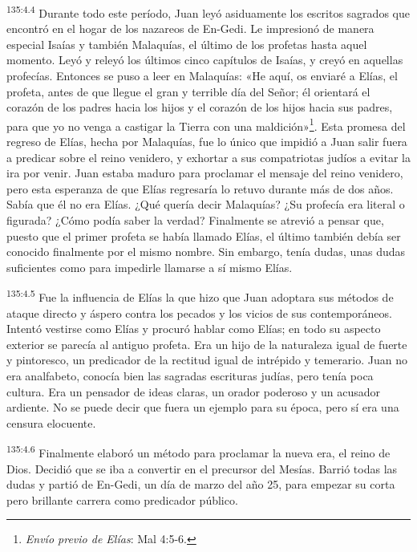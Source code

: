 \par
\textsuperscript{135:4.4} Durante todo este período, Juan leyó asiduamente los escritos sagrados que encontró en el hogar de los nazareos de En-Gedi. Le impresionó de manera especial Isaías y también Malaquías, el último de los profetas hasta aquel momento. Leyó y releyó los últimos cinco capítulos de Isaías, y creyó en aquellas profecías. Entonces se puso a leer en Malaquías: «He aquí, os enviaré a Elías, el profeta, antes de que llegue el gran y terrible día del Señor; él orientará el corazón de los padres hacia los hijos y el corazón de los hijos hacia sus padres, para que yo no venga a castigar la Tierra con una maldición»\footnote{\textit{Envío previo de Elías}: Mal 4:5-6.}. Esta promesa del regreso de Elías, hecha por Malaquías, fue lo único que impidió a Juan salir fuera a predicar sobre el reino venidero, y exhortar a sus compatriotas judíos a evitar la ira por venir. Juan estaba maduro para proclamar el mensaje del reino venidero, pero esta esperanza de que Elías regresaría lo retuvo durante más de dos años. Sabía que él no era Elías. ¿Qué quería decir Malaquías? ¿Su profecía era literal o figurada? ¿Cómo podía saber la verdad? Finalmente se atrevió a pensar que, puesto que el primer profeta se había llamado Elías, el último también debía ser conocido finalmente por el mismo nombre. Sin embargo, tenía dudas, unas dudas suficientes como para impedirle llamarse a sí mismo Elías.

\par
\textsuperscript{135:4.5} Fue la influencia de Elías la que hizo que Juan adoptara sus métodos de ataque directo y áspero contra los pecados y los vicios de sus contemporáneos. Intentó vestirse como Elías y procuró hablar como Elías; en todo su aspecto exterior se parecía al antiguo profeta. Era un hijo de la naturaleza igual de fuerte y pintoresco, un predicador de la rectitud igual de intrépido y temerario. Juan no era analfabeto, conocía bien las sagradas escrituras judías, pero tenía poca cultura. Era un pensador de ideas claras, un orador poderoso y un acusador ardiente. No se puede decir que fuera un ejemplo para su época, pero sí era una censura elocuente.

\par
\textsuperscript{135:4.6} Finalmente elaboró un método para proclamar la nueva era, el reino de Dios. Decidió que se iba a convertir en el precursor del Mesías. Barrió todas las dudas y partió de En-Gedi, un día de marzo del año 25, para empezar su corta pero brillante carrera como predicador público.

